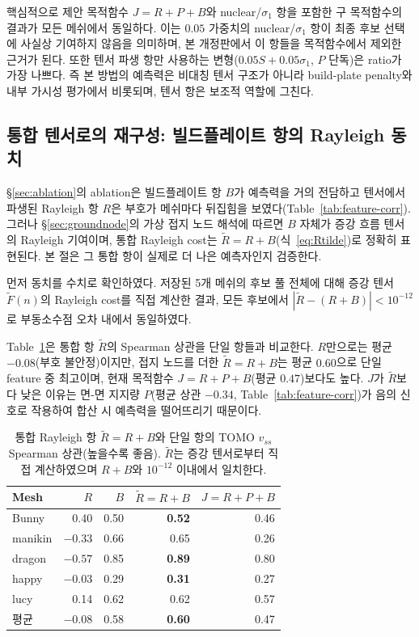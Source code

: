 \documentclass[11pt,a4paper]{article}
\begin{document}
핵심적으로 제안 목적함수 $J=R+P+B$와 nuclear/$\sigma_1$ 항을 포함한 구 목적함수의 결과가 모든 메쉬에서 동일하다.
이는 $0.05$ 가중치의 nuclear/$\sigma_1$ 항이 최종 후보 선택에 사실상 기여하지 않음을 의미하며,
본 개정판에서 이 항들을 목적함수에서 제외한 근거가 된다.
또한 텐서 파생 항만 사용하는 변형($0.05S+0.05\sigma_1$, $P$ 단독)은 ratio가 가장 나쁘다.
즉 본 방법의 예측력은 비대칭 텐서 구조가 아니라 build-plate penalty와 내부 가시성 평가에서 비롯되며,
텐서 항은 보조적 역할에 그친다.

\subsection{통합 텐서로의 재구성: 빌드플레이트 항의 Rayleigh 동치}
\label{sec:unified}

\S\ref{sec:ablation}의 ablation은 빌드플레이트 항 $B$가 예측력을 거의 전담하고
텐서에서 파생된 Rayleigh 항 $R$은 부호가 메쉬마다 뒤집힘을 보였다(Table~\ref{tab:feature-corr}).
그러나 \S\ref{sec:groundnode}의 가상 접지 노드 해석에 따르면 $B$ 자체가 증강 흐름 텐서의 Rayleigh 기여이며,
통합 Rayleigh cost는 $\tilde R=R+B$(식~\eqref{eq:Rtilde})로 정확히 표현된다.
본 절은 그 통합 항이 실제로 더 나은 예측자인지 검증한다.

먼저 동치를 수치로 확인하였다.
저장된 5개 메쉬의 후보 풀 전체에 대해 증강 텐서 $\tilde F(n)$의 Rayleigh cost를 직접 계산한 결과,
모든 후보에서 $|\tilde R-(R+B)|<10^{-12}$로 부동소수점 오차 내에서 동일하였다.

Table~\ref{tab:unified-corr}은 통합 항 $\tilde R$의 Spearman 상관을 단일 항들과 비교한다.
$R$만으로는 평균 $-0.08$(부호 불안정)이지만,
접지 노드를 더한 $\tilde R=R+B$는 평균 $0.60$으로 단일 feature 중 최고이며,
현재 목적함수 $J=R+P+B$(평균 $0.47$)보다도 높다.
$J$가 $\tilde R$보다 낮은 이유는 면-면 지지량 $P$(평균 상관 $-0.34$, Table~\ref{tab:feature-corr})가
음의 신호로 작용하여 합산 시 예측력을 떨어뜨리기 때문이다.

\begin{table}[H]
\centering
\caption{통합 Rayleigh 항 $\tilde R=R+B$와 단일 항의 TOMO $v_{ss}$ Spearman 상관(높을수록 좋음).
$\tilde R$는 증강 텐서로부터 직접 계산하였으며 $R+B$와 $10^{-12}$ 이내에서 일치한다.}
\label{tab:unified-corr}
\begin{tabular}{lrrrr}
\toprule
Mesh & $R$ & $B$ & $\tilde R=R{+}B$ & $J=R{+}P{+}B$\\
\midrule
Bunny   & 0.40 & 0.50 & \textbf{0.52} & 0.46\\
manikin & $-0.33$ & 0.66 & 0.65 & 0.26\\
dragon  & $-0.57$ & 0.85 & \textbf{0.89} & 0.80\\
happy   & $-0.03$ & 0.29 & \textbf{0.31} & 0.27\\
lucy    & 0.14 & 0.62 & 0.62 & 0.57\\
\midrule
평균    & $-0.08$ & 0.58 & \textbf{0.60} & 0.47\\
\bottomrule
\end{tabular}
\end{table}
\end{document}
